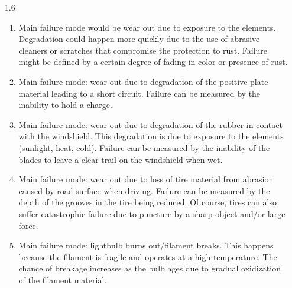 \documentclass[12pt]{article}\usepackage[]{graphicx}\usepackage[]{color}
\begin{document}
\begin{enumerate}
  \item[1.6]
  \begin{enumerate}
    \item Main failure mode would be wear out due to exposure to the elements. Degradation could happen more quickly due to the use of abrasive cleaners or scratches that compromise the protection to rust. Failure might be defined by a certain degree of fading in color or presence of rust.
  
    \item Main failure mode: wear out due to degradation of the positive plate material leading to a short circuit. Failure can be measured by the inability to hold a charge.
    
    \item Main failure mode: wear out due to degradation of the rubber in contact with the windshield. This degradation is due to exposure to the elements (sunlight, heat, cold). Failure can be measured by the inability of the blades to leave a clear trail on the windshield when wet.
    
    \item Main failure mode: wear out due to loss of tire material from abrasion caused by road surface when driving. Failure can be measured by the depth of the grooves in the tire being reduced. Of course, tires can also suffer catastrophic failure due to puncture by a sharp object and/or large force.
    
    \item Main failure mode: lightbulb burns out/filament breaks. This happens because the filament is fragile and operates at a high temperature. The chance of breakage increases as the bulb ages due to gradual oxidization of the filament material.
    

\end{enumerate}
\end{enumerate}
\end{document}
